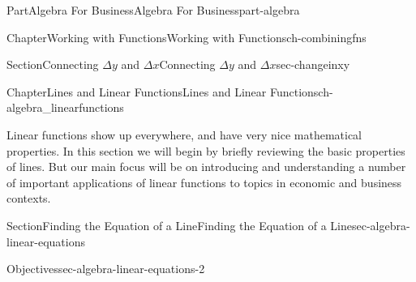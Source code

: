 \documentclass[oneside,10pt,]{tufte-book}
\numberwithin{equation}{chapter}
\begin{document}
\begin{partptx}{Part}{Algebra For Business}{}{Algebra For Business}{}{}{part-algebra}
\begin{chapterptx}{Chapter}{Working with Functions}{}{Working with Functions}{}{}{ch-combiningfns}
\begin{sectionptx}{Section}{\textasteriskcentered{}Connecting \(\Delta y\) and \(\Delta x\)}{}{\textasteriskcentered{}Connecting \(\Delta y\) and \(\Delta x\)}{}{}{sec-changeinxy}
\end{sectionptx}
\end{chapterptx}
%
\typeout{************************************************}
\typeout{************************************************}
%
\begin{chapterptx}{Chapter}{Lines and Linear Functions}{}{Lines and Linear Functions}{}{}{ch-algebra_linearfunctions}
\renewcommand*{\chaptername}{Chapter}
\begin{introduction}{}%
Linear functions show up everywhere, and have very nice mathematical properties.  In this section we will begin by briefly reviewing the basic properties of lines. But our main focus will be on introducing and understanding a number of important applications of linear functions to topics in economic and business contexts.%
\begin{image}{0}{1}{0}{}%
%
\end{image}%
\end{introduction}%
%
%
\typeout{************************************************}
\typeout{************************************************}
%
\begin{sectionptx}{Section}{Finding the Equation of a Line}{}{Finding the Equation of a Line}{}{}{sec-algebra-linear-equations}
\begin{objectives}{Objectives}{sec-algebra-linear-equations-2}

\end{objectives}
\end{sectionptx}
\end{chapterptx}
\end{partptx}
\end{document}
